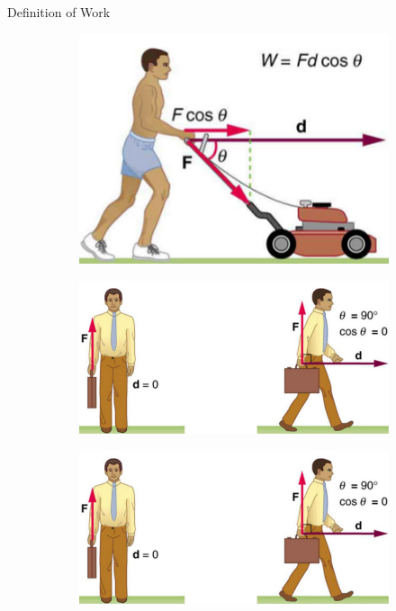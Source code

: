 \documentclass{beamer}
\begin{document}
\begin{frame}{Definition of Work}
\begin{figure}
\centering
\begin{subfigure}{0.3\textwidth}
\centering
\includegraphics[width=\textwidth]{figures/lawn1.png}
\caption{}
\end{subfigure}
\begin{subfigure}{0.135\textwidth}
\centering
\includegraphics[width=\textwidth,trim=0cm 0cm 15cm 0cm,clip=true]{figures/lawn2.png}
\caption{}
\end{subfigure}
\begin{subfigure}{0.2\textwidth}
\centering
\includegraphics[width=\textwidth,trim=12cm 0cm 0cm 0cm,clip=true]{figures/lawn2.png}

\end{subfigure}
\end{figure}
\end{frame}
\end{document}
